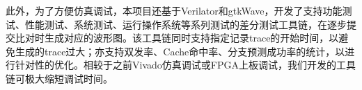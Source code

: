 此外，为了方便仿真调试，本项目还基于Verilator和gtkWave，开发了支持功能测试、性能测试、系统测试、运行操作系统等系列测试的差分测试工具链，在逐步提交比对时生成对应的波形图。该工具链同时支持指定记录trace的开始时间，以避免生成的trace过大；亦支持双发率、Cache命中率、分支预测成功率的统计，以进行针对性的优化。相较于之前Vivado仿真调试或FPGA上板调试，我们开发的工具链可极大缩短调试时间。